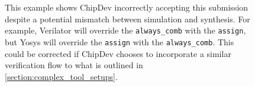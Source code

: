 
\begin{figure}[t]
    \centering
    \caption{This example shows ChipDev \cite{ChipDev} incorrectly accepting this submission despite a potential mismatch between simulation and synthesis. For example, Verilator will override the \texttt{always_comb} with the \texttt{assign}, but Yosys will override the \texttt{assign} with the \texttt{always_comb}. This could be corrected if ChipDev chooses to incorporate a similar verification flow to what is outlined in \autoref{section:complex_tool_setups}.}
    \label{fig:chipdev_hack}
\end{figure}
